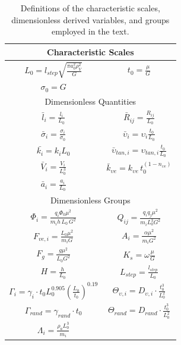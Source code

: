 \begin{table}[H]
\begin{centering}
\begin{tabular}{cc}
\hline
\multicolumn{2}{c}{Characteristic Scales}\tabularnewline
\hline
\hline
$L_{0}=l_{step}\sqrt{\frac{\pi a_{0}^{2}\rho_{V}^{2}}{G}}$  & $t_{0}=\frac{\mu}{G}$\tabularnewline
$\sigma_{0}=G$  & \tabularnewline
\hline
\multicolumn{2}{c}{Dimensionless Quantities}\tabularnewline
\hline
\hline
$\bar{l}_{i}={\displaystyle \frac{l_{i}}{L_{0}}}$  & $\bar{R}_{ij}={\displaystyle \frac{R_{ij}}{L_{0}}}$\tabularnewline
$\bar{\sigma}_{i}={\displaystyle \frac{\sigma_{i}}{\sigma_{0}}}$  & $\bar{\upsilon}_{i}=\upsilon_{i}{\displaystyle \frac{t_{0}}{L_{0}}}$ \tabularnewline
$\bar{k_{i}}=k_{i}L_{0}$  & $\bar{\upsilon}_{tan,i}=\upsilon_{tan,i}{\displaystyle \frac{t_{0}}{L_{0}}}$ \tabularnewline
$\bar{V}_{i}={\displaystyle \frac{V_{i}}{L_{0}^{3}}}$  & ${\displaystyle \bar{k}_{\upsilon e}=k_{\upsilon e}\,t_{0}^{\left(1-n_{\upsilon e}\right)}}$\tabularnewline
$\bar{a}_{i}={\displaystyle \frac{a_{i}}{L_{0}}}$  & \tabularnewline
\hline
\multicolumn{2}{c}{Dimensionless Groups}\tabularnewline
\hline
\hline
$\Phi_{i}={\displaystyle \frac{q_{i}\Phi_{0}\mu^{2}}{m_{i}h\,L_{0}\,G^{2}}}$  & $Q_{ij}={\displaystyle \frac{q_{i}q_{j}\mu^{2}}{m_{i}L_{0}^{3}G^{2}}}$\tabularnewline
$F_{ve,i}={\displaystyle \frac{L_{0}\mu^{2}}{m_{i}G}}$  & $A_{i}={\displaystyle \frac{\alpha\mu^{2}}{m_{i}G^{2}}}$\tabularnewline
$F_{g}={\displaystyle \frac{g\mu^{2}}{L_{0}G^{2}}}$  & $K_{s}=\omega{\displaystyle \frac{\mu}{G}}$\tabularnewline
$H={\displaystyle \frac{h}{L_{0}}}$  & $L_{step}={\displaystyle \frac{l_{step}}{L_{0}}}$\tabularnewline
$\Gamma_{i}={\displaystyle \gamma_{i}\cdot t_{0}L_{0}^{0.905}\left(\frac{L_{0}}{t_{0}}\right)^{0.19}}$  & $\Theta_{\upsilon,i}=D_{\upsilon,i}\cdot{\displaystyle \frac{t_{0}^{3}}{L_{0}^{2}}}$\tabularnewline
$\Gamma_{rand}={\displaystyle \gamma_{rand}\cdot t_{0}}$  & $\Theta_{rand}=D_{rand}\cdot{\displaystyle \frac{t_{0}^{3}}{L_{0}^{2}}}$\tabularnewline
$\Lambda_{i}={\displaystyle \frac{\rho_{a}L_{0}^{3}}{m_{i}}}$  & \tabularnewline
\hline
\end{tabular}
\par\end{centering}
\protect\protect\protect\caption{Definitions of the characteristic scales, dimensionless derived variables,
and groups employed in the text.}

\label{tab:tabella-adimensionale}
\end{table}
